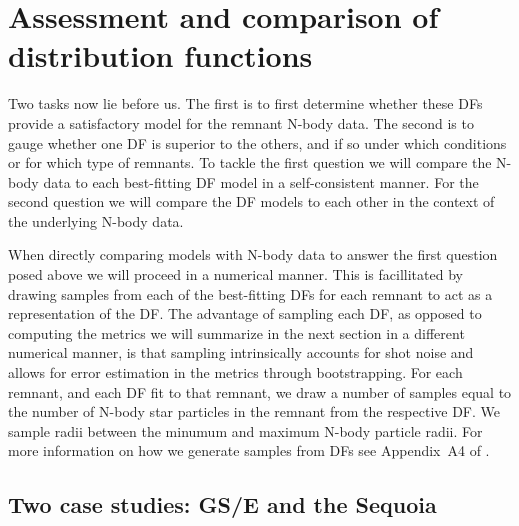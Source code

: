 

\section{Assessment and comparison of distribution functions}
\label{ch4:sec:assessment-comparison-distribution-functions}

Two tasks now lie before us. The first is to first determine whether these DFs provide a satisfactory model for the remnant N-body data. The second is to gauge whether one DF is superior to the others, and if so under which conditions or for which type of remnants. To tackle the first question we will compare the N-body data to each best-fitting DF model in a self-consistent manner. For the second question we will compare the DF models to each other in the context of the underlying N-body data.

When directly comparing models with N-body data to answer the first question posed above we will proceed in a numerical manner. This is facillitated by drawing samples from each of the best-fitting DFs for each remnant to act as a representation of the DF. The advantage of sampling each DF, as opposed to computing the metrics we will summarize in the next section in a different numerical manner, is that sampling intrinsically accounts for shot noise and allows for error estimation in the metrics through bootstrapping. For each remnant, and each DF fit to that remnant, we draw a number of samples equal to the number of N-body star particles in the remnant from the respective DF. We sample radii between the minumum and maximum N-body particle radii. For more information on how we generate samples from DFs see Appendix~A4 of \textcite{lane23}.

\subsection{Two case studies: GS/E and the Sequoia}
\label{ch4:subsec:case-studies}

